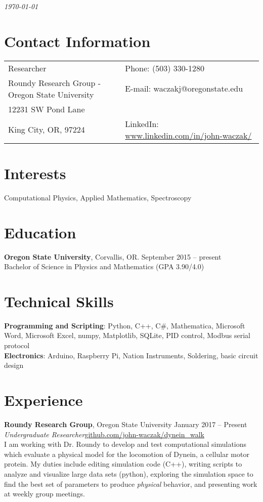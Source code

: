 \documentclass[margin,line]{res}
\begin{document}
 \hfill {\em \today}

\begin{resume}
\section{\sc Contact Information}

\vspace{.05in}
\begin{tabular}{@{}p{3.5in}p{3in}}
Researcher              & {Phone:}  (503) 330-1280 \\
Roundy Research Group - Oregon State University 
 & {E-mail:}  waczakj@oregonstate.edu\\
12231 SW Pond Lane\\
King City, OR, 97224  & {LinkedIn:} \scriptsize{ \url{www.linkedin.com/in/john-waczak/}}
\end{tabular}


\section{\sc Interests}

Computational Physics, Applied Mathematics, Spectroscopy

\section{\sc Education}
{\bf Oregon State University}, Corvallis, OR. \hfill September 2015 -- present\\
Bachelor of Science in Physics and Mathematics \hfill(GPA 3.90/4.0)

\section{\sc Technical Skills}
{\bf Programming and Scripting}: Python, C++, C\#, Mathematica, Microsoft Word, Microsoft Excel, numpy, Matplotlib, SQLite, PID control, Modbus serial protocol \\
{\bf Electronics}: Arduino, Raspberry Pi, Nation Instruments, Soldering, basic circuit design \\ 
\section{\sc Experience}
{\bf Roundy Research Group}, Oregon State University \hfill{January 2017 -- Present}\\
{\em Undergraduate Researcher}\hfill \scriptsize{\url{github.com/john-waczak/dynein_walk}}\\
I am working with Dr. Roundy to develop and test computational simulations which evaluate a physical model for the locomotion of Dynein, a cellular motor protein. My duties include editing simulation code (C++), writing scripts to analyze and visualize large data sets (python), exploring the simulation space to find the best set of parameters to produce \textit{physical} behavior, and presenting work at weekly group meetings.


\end{resume}
\end{document}
